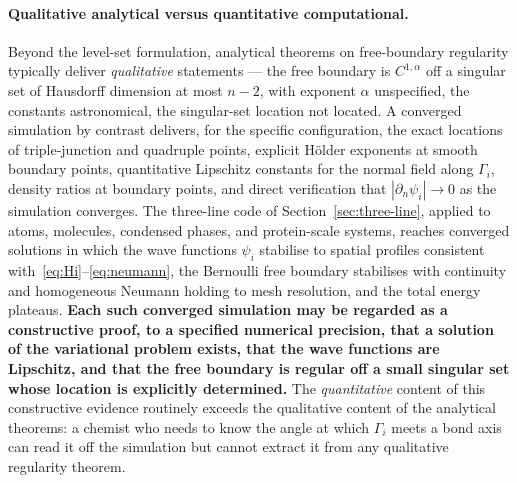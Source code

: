 \paragraph{Qualitative analytical versus quantitative computational.}
Beyond the level-set formulation, analytical theorems on free-boundary regularity typically deliver \emph{qualitative} statements --- the free boundary is $C^{1,\alpha}$ off a singular set of Hausdorff dimension at most $n-2$, with exponent $\alpha$ unspecified, the constants astronomical, the singular-set location not located. A converged simulation by contrast delivers, for the specific configuration, the exact locations of triple-junction and quadruple points, explicit H\"older exponents at smooth boundary points, quantitative Lipschitz constants for the normal field along $\Gamma_i$, density ratios at boundary points, and direct verification that $|\partial_n \psi_i| \to 0$ as the simulation converges. The three-line code of Section~\ref{sec:three-line}, applied to atoms, molecules, condensed phases, and protein-scale systems, reaches converged solutions in which the wave functions $\psi_i$ stabilise to spatial profiles consistent with~\eqref{eq:Hi}--\eqref{eq:neumann}, the Bernoulli free boundary stabilises with continuity and homogeneous Neumann holding to mesh resolution, and the total energy plateaus. \textbf{Each such converged simulation may be regarded as a constructive proof, to a specified numerical precision, that a solution of the variational problem exists, that the wave functions are Lipschitz, and that the free boundary is regular off a small singular set whose location is explicitly determined.} The \emph{quantitative} content of this constructive evidence routinely exceeds the qualitative content of the analytical theorems: a chemist who needs to know the angle at which $\Gamma_i$ meets a bond axis can read it off the simulation but cannot extract it from any qualitative regularity theorem.

